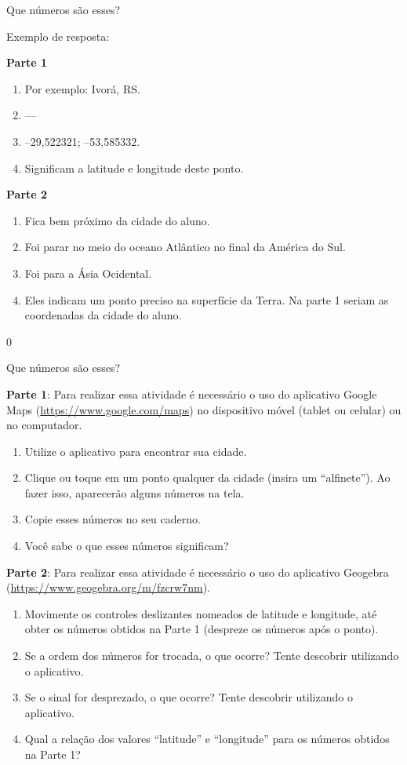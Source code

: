 \begin{answer}{Que números são esses?}
{Exemplo de resposta:

  \textbf{Parte 1}
  \begin{enumerate}
  \item Por exemplo: Ivorá, RS.
  \item ---
  \item --29{,}522321; --53,585332.
  \item Significam a latitude e longitude deste ponto.
  \end{enumerate}
\vspace{\baselineskip}
  \textbf{Parte 2}
  \begin{enumerate}
  \item Fica bem próximo da  cidade do aluno.
  \item Foi parar no meio do oceano Atlântico no final da América do Sul.
  \item Foi para a Ásia Ocidental.
  \item Eles indicam um ponto preciso na superfície da Terra. Na parte 1 seriam as coordenadas da  cidade do aluno.
  \end{enumerate}
}{0}
\end{answer}

\label{coord_geo}



\begin{task}{Que números são esses?} \label{at_numeros}

\textbf{Parte 1}: Para realizar essa atividade é necessário o uso do aplicativo Google Maps (\url{https://www.google.com/maps}) no dispositivo móvel (tablet ou celular) ou no computador.

\begin{enumerate}
\item Utilize o aplicativo para encontrar sua cidade.
\item Clique ou toque em um ponto qualquer da cidade (insira um “alfinete”). Ao fazer isso, aparecerão alguns números na tela.
\item Copie esses números no seu caderno.
\item Você sabe o que esses números significam?
\end{enumerate}

\textbf{Parte 2}: Para realizar essa atividade é necessário o uso do aplicativo Geogebra (\url{https://www.geogebra.org/m/fzcrw7nm}).
\begin{enumerate}
\item Movimente os controles deslizantes nomeados de latitude e longitude, até obter os números obtidos na Parte 1 (despreze os números após o ponto).
\item Se a ordem dos números for trocada, o que ocorre? Tente descobrir utilizando o aplicativo.
\item Se o sinal for desprezado, o que ocorre? Tente descobrir utilizando o aplicativo.
\item Qual a relação dos valores “latitude” e “longitude” para os números obtidos na Parte 1?
\end{enumerate}

\end{task}


